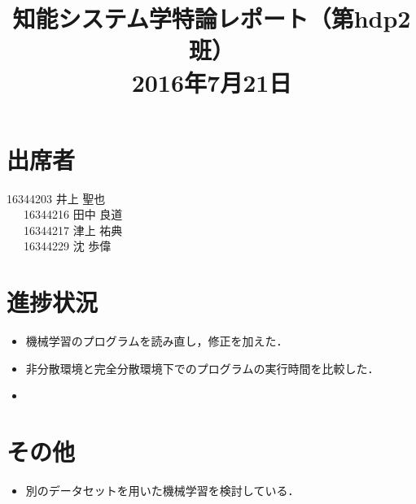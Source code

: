 \documentclass[a4paper,12pt]{jarticle}
\begin{document}
%
\title{\vspace{-30mm}知能システム学特論レポート（第hdp2班）\\ 2016年7月21日}
\date{}
%
%
\maketitle
%
\vspace{-30mm}
%
\section{出席者}
16344203 井上 聖也\\
~~~16344216 田中 良道\\
~~~16344217 津上 祐典\\
~~~16344229 沈 歩偉
\section{進捗状況}
\begin{itemize}
 \item 機械学習のプログラムを読み直し，修正を加えた．
 \item 非分散環境と完全分散環境下でのプログラムの実行時間を比較した．
 \item 
\end{itemize}

\section{その他}
\begin{itemize}
 \item 別のデータセットを用いた機械学習を検討している．
\end{itemize}
\end{document}
